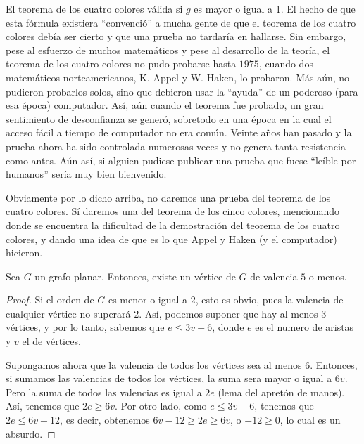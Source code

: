 \begin{section}{El teorema de los cuatro colores}
válida si $g$ es mayor o igual a 1. El hecho de que esta fórmula existiera ``convenció'' a mucha gente de que el teorema de los cuatro colores debía ser cierto y que una prueba no tardaría en hallarse. Sin embargo, pese al esfuerzo de muchos matemáticos y pese al desarrollo de la teoría, el teorema de los cuatro colores no pudo probarse hasta $1975$, cuando dos matemáticos  norteamericanos, K. Appel y W. Haken, lo probaron. Más aún, no pudieron probarlos solos, sino que debieron usar la ``ayuda'' de un poderoso (para esa época) computador. Así, aún cuando el teorema fue probado, un gran sentimiento de desconfianza se generó, sobretodo en una época en la cual el acceso fácil a tiempo de computador no era común. Veinte años han pasado y la prueba ahora ha sido controlada numerosas veces y no genera tanta resistencia como antes. Aún así, si alguien pudiese publicar una prueba que fuese ``leíble por humanos'' sería muy bien bienvenido.

Obviamente por lo dicho arriba, no daremos una prueba del teorema de los cuatro colores. Sí daremos una del teorema de los cinco colores, mencionando donde se encuentra la dificultad de la demostración del teorema de los  cuatro colores, y dando una idea de que es lo que Appel y Haken (y el computador) hicieron. 

\begin{lema} \label{lA4.3.1} Sea $G$ un grafo planar. Entonces, existe un vértice de $G$ de valencia $5$ o menos.
\end{lema}
\begin{proof} Si el orden de $G$ es menor o igual a $2$, esto es obvio, pues la valencia de cualquier vértice no superará $2$. Así, podemos suponer que hay al menos $3$ vértices, y por lo tanto, sabemos que $e\le 3v-6$, donde $e$ es el numero de aristas y $v$ el de vértices.

Supongamos ahora que la valencia de todos los vértices sea al menos $6$. Entonces, si sumamos las valencias de todos los vértices, la suma sera mayor o igual a $6v$. Pero la suma de todos las
valencias es igual a $2e$ (lema del apretón de manos). Así, tenemos que $2e\ge 6v$. Por otro lado, como $e\le 3v-6$, tenemos que $2e\le 6v-12$, es decir, obtenemos $6v-12\ge 2e\ge 6v$, o $-12\ge 0$, lo cual es un absurdo.
\end{proof}


\end{section}
